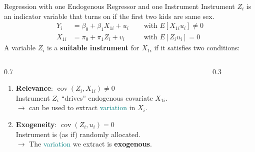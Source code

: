 \documentclass[9pt,aspectratio=169, xcolor=dvipsnames]{beamer}
\begin{document}
\begin{frame}{Regression with one Endogenous Regressor and one Instrument}
\linespread{1.3}\selectfont %
Instrument $Z_i$ is an indicator variable that turns on if the first two kids are same sex.
\pause
\begin{align*}
    Y_{i} &= \beta_0 + \beta_1 X_{1i} + u_i \quad &\text{ with } E[X_{1i}u_i] \neq 0 
    \\
    X_{1i} &= \pi_0 + \pi_1 Z_i + v_{i } \quad &\text{ with } E[Z_iu_i] = 0 
\end{align*}
\pause
A variable $Z_i$ is a \textbf{suitable instrument} for $X_{1i}$ if it satisfies two conditions:
\pause
\begin{columns}[T]

\begin{column}{0.7\textwidth}

\begin{enumerate}
    \item \textcolor{mygold}{\textbf{Relevance}}: $ \operatorname{cov}(Z_i, X_{1i}) \neq 0 $ \\
          Instrument $Z_i$ ``drives'' endogenous covariate $X_{1i}$. \\
          $\rightarrow$ can be used to extract \textcolor{teal}{variation} in $X_i$.
    \item \textcolor{mypetrol}{\textbf{Exogeneity}}: $ \operatorname{cov}(Z_i, u_i) = 0 $ \\
          Instrument is (as if) randomly allocated. \\
          $\rightarrow$ The \textcolor{teal}{variation} we extract is \textbf{exogenous}.
\end{enumerate}

\end{column}

\begin{column}{0.3\textwidth}

\begin{center}
\vspace*{\fill}

\end{center}
\end{column}
\end{columns}
\end{frame}
\end{document}
